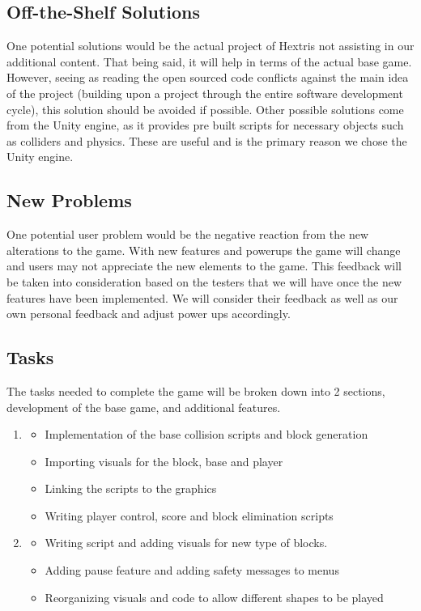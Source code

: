 \documentclass[12pt, titlepage]{article}
\begin{document}
\subsection{Off-the-Shelf Solutions}
One potential solutions would be the actual project of Hextris not assisting in our additional content. That being said, it will help in terms of the actual base game. However, seeing as reading the open sourced code conflicts against the main idea of the project (building upon a project through the entire software development cycle), this solution should be avoided if possible. Other possible solutions come from the Unity engine, as it provides pre built scripts for necessary objects such as colliders and physics. These are useful and is the primary reason we chose the Unity engine.

\subsection{New Problems}
One potential user problem would be the negative reaction from the new alterations to the game. With new features and powerups the game will change and users may not appreciate the new elements to the game. This feedback will be taken into consideration based on the testers that we will have once the new features have been implemented. We will consider their feedback as well as our own personal feedback and adjust power ups accordingly. 

\subsection{Tasks}
The tasks needed to complete the game will be broken down into 2 sections, development of the base game, and additional features. 

\begin{enumerate}
\item 
\begin{itemize}
\item Implementation of the base collision scripts and block generation
\item Importing visuals for the block, base and player
\item Linking the scripts to the graphics
\item Writing player control, score and block elimination scripts
\end{itemize}

\item
\begin{itemize}
\item Writing script and adding visuals for new type of blocks.
\item Adding pause feature and adding safety messages to menus
\item Reorganizing visuals and code to allow different shapes to be played
\end{itemize}
\end{enumerate}
\end{document}
